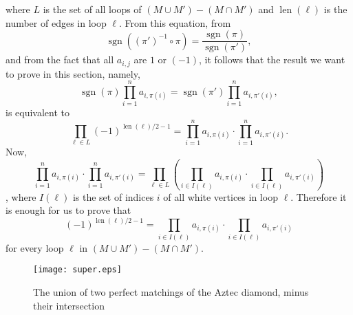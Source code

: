 \documentclass[10pt,reqno]{amsart}
\theoremstyle{plain}
\theoremstyle{definition}
\theoremstyle{remark}
\DeclareMathOperator{\sgn }{sgn }
\DeclareMathOperator{\len }{len }
\begin{document}
where $L$ is the set of all loops of $(M\cup M\prime)-(M\cap M\prime)$ and
$\len(\ell ) $ is the number of edges in loop $\ell $. From this equation, from
\begin{equation}\sgn((\pi\prime)^{-1} \circ \pi) = \frac{\sgn(\pi )}{\sgn(\pi \prime )},\end{equation}
and from the fact that all $a_{i,j}$ are $1$ or $(-1)$, it follows that
the result we want to prove in this section, namely,
\begin{equation}\sgn(\pi ) \prod_{i=1}^n a_{i,\pi(i)} = \sgn(\pi \prime)
        \prod_{i=1}^n a_{i,\pi \prime (i)},\end{equation}
is equivalent to
\begin{equation}\prod_{\ell\in L} (-1)^{\len(\ell)/2-1} = \prod_{i=1}^n a_{i,\pi(i)} \cdot
				       \prod_{i=1}^n a_{i,\pi \prime (i)}.\end{equation}
Now, 
\begin{equation}\prod_{i=1}^n a_{i,\pi(i)} \cdot \prod_{i=1}^n a_{i,\pi \prime (i)}
= \prod_{\ell \in L} (\prod_{i\in I(\ell )} a_{i,\pi(i) } \cdot
			\prod_{i\in I(\ell )} a_{i,\pi \prime(i) })\end{equation},
where $I(\ell )$ is the set of indices $i$ of all white vertices in loop
$\ell $. Therefore it is enough for us to prove that
\begin{equation}
(-1)^{\len(\ell)/2-1} =
\prod_{i\in I(\ell )} a_{i,\pi(i) } \cdot
			\prod_{i\in I(\ell )} a_{i,\pi \prime(i) }
\end{equation}
for every loop $\ell $ in $(M\cup M\prime)-(M\cap M\prime)$.

\begin{figure}
\centering
	\texttt{[image: super.eps]}
	\caption{The union of two perfect matchings of the Aztec diamond,
	 minus their intersection}\label{super}
\end{figure}
\end{document}
